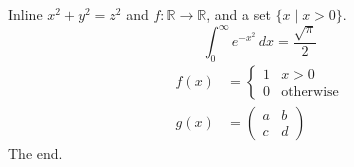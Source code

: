 Inline $x^2+y^2=z^2$ and $f\colon \mathbb{R}\to\mathbb{R}$, and a set
$\{x \mid x>0\}$.
\[ \int_0^\infty e^{-x^2}\,dx = \frac{\sqrt{\pi}}{2} \]
\begin{align}
  f(x) &= \begin{cases} 1 & x > 0 \\ 0 & \text{otherwise} \end{cases} \\
  g(x) &= \begin{pmatrix} a & b \\ c & d \end{pmatrix}
\end{align}
The end.
